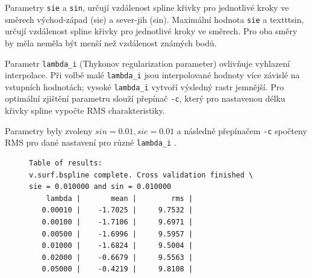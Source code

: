 \documentclass[a4paper,12pt,oneside]{report}
\begin{document}
\begin{description}

\item Parametry \texttt{sie} a \texttt{sin}, určují vzdálenost spline
  křivky pro jednotlivé kroky ve směrech východ-západ (sie) a
  sever-jih (sin). Maximální hodnota \texttt{sie} a texttt{sin}, určují vzdálenost spline
  křivky pro jednotlivé kroky ve směrech. Pro oba směry by měla neměla 
  být menší než vzdálenost známých bodů.

\item Parametr \texttt{lambda\_i} (Thykonov regularization parameter)
  ovlivňuje vyhlazení interpolace. Při volbě malé \texttt{lambda\_i}
  jsou interpolované hodnoty více závislé na vstupních hodnotách;
  vysoké \texttt{lambda\_i} vytvoří výsledný rastr jemnější. Pro
  optimální zjištění parametru slouží přepínač \texttt{-c}, který pro
  nastavenou délku křivky spline vypočte RMS charakteristiky.
\end{description}


Parametry byly zvoleny $sin=0.01, sie=0.01$ a následně přepínačem
\texttt{-c} spočteny RMS pro dané nastavení pro různé
\texttt{lambda\_i} .
\begin{figure}[h!]
\begin{footnotesize}
\lstset{extendedchars=false,
escapeinside=''}
\begin{lstlisting}[style=mybash]
Table of results:
v.surf.bspline complete. Cross validation finished \
sie = 0.010000 and sin = 0.010000
    lambda |       mean |        rms |
   0.00010 |    -1.7025 |     9.7532 |
   0.00100 |    -1.7106 |     9.6971 |
   0.00500 |    -1.6996 |     9.5957 |
   0.01000 |    -1.6824 |     9.5004 |
   0.02000 |    -0.6679 |     9.5563 |
   0.05000 |    -0.4219 |     9.8108 |
\end{lstlisting}
\end{footnotesize} 
\end{figure}
\end{document}
